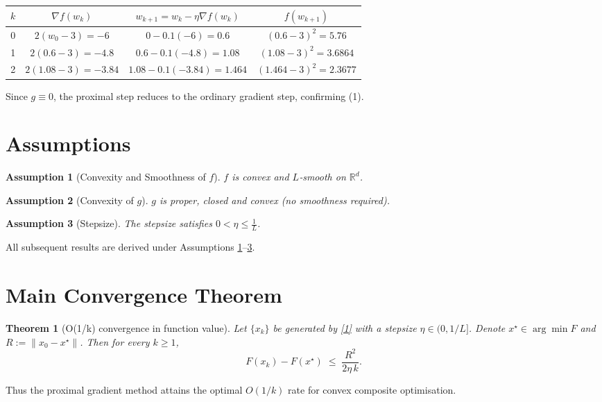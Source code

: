\documentclass{article}
\newtheorem{theorem}{Theorem}
\newtheorem{assumption}{Assumption}
\newcommand{\R}{\mathbb{R}}
\begin{document}
\begin{center}
\begin{tabular}{c|c|c|c}
$k$ & $\nabla f(w_{k})$ & $w_{k+1}=w_{k}-\eta\nabla f(w_{k})$ & $f(w_{k+1})$\\\hline
0 & $2(w_{0}-3)=-6$ & $0-0.1(-6)=0.6$ & $(0.6-3)^{2}=5.76$\\
1 & $2(0.6-3)=-4.8$ & $0.6-0.1(-4.8)=1.08$ & $(1.08-3)^{2}=3.6864$\\
2 & $2(1.08-3)=-3.84$ & $1.08-0.1(-3.84)=1.464$ & $(1.464-3)^{2}=2.3677$\\
\end{tabular}
\end{center}
Since $g\equiv0$, the proximal step reduces to the ordinary gradient step, confirming (1).

\newpage
\section*{Assumptions}
\begin{assumption}[Convexity and Smoothness of $f$]
\label{ass:convexsmooth}
$f$ is convex and $L$‑smooth on $\R^{d}$.
\end{assumption}
\begin{assumption}[Convexity of $g$]
\label{ass:convexg}
$g$ is proper, closed and convex (no smoothness required).
\end{assumption}
\begin{assumption}[Stepsize]
\label{ass:stepsize}
The stepsize satisfies $0<\eta\le \frac{1}{L}$.
\end{assumption}
All subsequent results are derived under Assumptions \ref{ass:convexsmooth}–\ref{ass:stepsize}.

\section*{Main Convergence Theorem}
\begin{theorem}[O(1/k) convergence in function value]\label{thm:rate}
Let $\{x_{k}\}$ be generated by \eqref{1} with a stepsize $\eta\in(0,1/L]$.  
Denote $x^{\star}\in\arg\min F$ and $R:=\|x_{0}-x^{\star}\|$.  
Then for every $k\ge 1$,
\[
F(x_{k})-F(x^{\star})\;\le\;\frac{R^{2}}{2\eta\,k}.
\tag{2}
\]
\end{theorem}
Thus the proximal gradient method attains the optimal $O(1/k)$ rate for convex composite optimisation.
\end{document}
